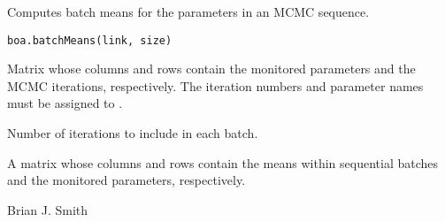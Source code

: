 \begin{Description}\relax
Computes batch means for the parameters in an MCMC sequence.
\end{Description}
\begin{Usage}
\begin{verbatim}
boa.batchMeans(link, size)
\end{verbatim}
\end{Usage}
\begin{Arguments}
\begin{ldescription}
\item[\code{link}] Matrix whose columns and rows contain the monitored parameters
and the MCMC iterations, respectively. The iteration numbers and parameter
names must be assigned to .
\item[\code{size}] Number of iterations to include in each batch.
\end{ldescription}
\end{Arguments}
\begin{Value}
A matrix whose columns and rows contain the means within sequential batches
and the monitored parameters, respectively.
\end{Value}
\begin{Author}\relax
Brian J. Smith
\end{Author}

